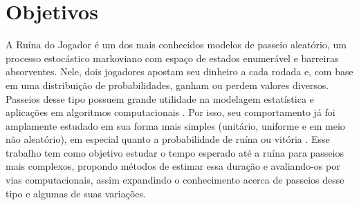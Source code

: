 \documentclass[a4paper,10pt,twocolumn]{article}
\begin{document}
\pagestyle{fancy}
\fancyhead{}
\renewcommand{\headrulewidth}{0pt}


\section{Objetivos}

A Ruína do Jogador é um dos mais conhecidos modelos de passeio aleatório, um
processo estocástico markoviano com espaço de estados enumerável e barreiras
absorventes. Nele, dois jogadores apostam seu dinheiro a cada rodada e, com base
em uma distribuição de probabilidades, ganham ou perdem valores diversos.
Passeios desse tipo possuem grande utilidade na modelagem estatística e
aplicações em algoritmos computacionais \cite{ross_markov_2019}. Por isso, seu
comportamento já foi amplamente estudado em sua forma mais simples (unitário,
uniforme e em meio não aleatório), em especial quanto a probabilidade de
ruína ou vitória \cite{ross_introduction_2019}. Esse trabalho tem como objetivo
estudar o tempo esperado até a ruína para passeios mais complexos, propondo
métodos de estimar essa duração e avaliando-os por vias computacionais, assim
expandindo o conhecimento acerca de passeios desse tipo e algumas de suas
variações.
\end{document}
